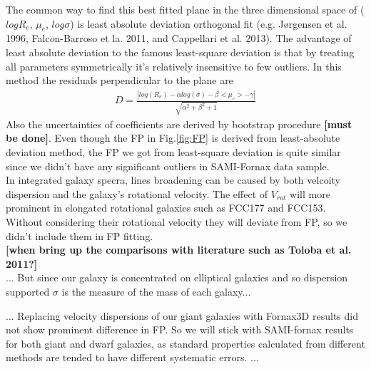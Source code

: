 \documentclass{aa}
\begin{document}
The common way to find this best fitted plane in the three dimensional space of ($logR_e$, $\mu_e$, $log\sigma$) is least absolute deviation orthogonal fit (e.g. J\o rgensen et al. 1996, Falc$\acute{o}$n-Barroso et la. 2011, and Cappellari et al. 2013). The advantage of least absolute deviation to the famous least-square deviation is that by treating all parameters symmetrically it's relatively insensitive to few outliers. In this method the residuals perpendicular to the plane are 
\begin{eqnarray}
	D = \frac{| log(R_e)-\alpha log(\sigma)-\beta <\mu_e>-\gamma |}{\sqrt{\alpha^2+\beta^2+1}}
\end{eqnarray}
Also the uncertainties of coefficients are derived by bootstrap procedure \textbf{[must be done]}. Even though the FP in Fig.\ref{fig:FP} is derived from least-absolute deviation method, the FP we got from least-square deviation is quite similar since we didn't have any significant outliers in SAMI-Fornax data sample.
\\In integrated galaxy specra, lines broadening  can be caused by both velcoity dispersion and the galaxy's rotational velocity. The effect of $V_{rot}$ will more prominent in elongated rotational galaxies such as FCC177 and FCC153. Without considering their rotational velocity they will deviate from FP, so we didn't include them in FP fitting.
\\
\textbf{[when bring up the comparisons with literature such as Toloba et al. 2011?]}\\

... But since our galaxy is concentrated on elliptical galaxies and so dispersion supported $\sigma$ is the measure of the mass of each galaxy...

... Replacing velocity dispersions of our giant galaxies with Fornax3D results did not show prominent difference in FP. So we will stick with SAMI-fornax results for both giant and dwarf galaxies, as standard properties calculated from different methods are tended to have different systematic errors. ... 
\end{document}
